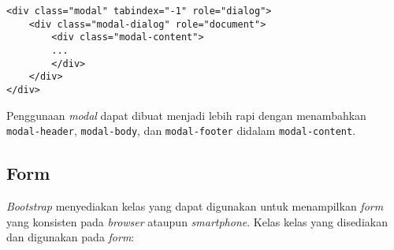 \begin{lstlisting}
<div class="modal" tabindex="-1" role="dialog">
	<div class="modal-dialog" role="document">
		<div class="modal-content">
		...
		</div>
	</div>
</div>
\end{lstlisting}

Penggunaan \textit{modal} dapat dibuat menjadi lebih rapi dengan menambahkan  \texttt{modal-header}, \texttt{modal-body}, dan \texttt{modal-footer} didalam \texttt{modal-content}.


\subsection{Form}
\textit{Bootstrap} menyediakan kelas yang dapat digunakan untuk menampilkan \textit{form} yang konsisten pada \textit{browser} ataupun \textit{smartphone}. Kelas kelas yang disediakan dan digunakan pada \textit{form}:
